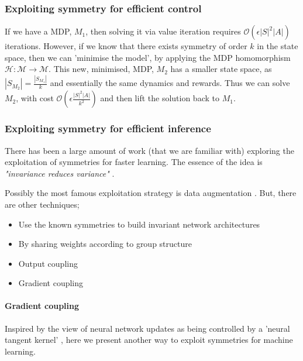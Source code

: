 
\subsubsection{Exploiting symmetry for efficient control}

If we have a MDP, $M_1$, then solving it via value iteration requires $\mathcal O(\epsilon |S|^2|A|)$ iterations.
However, if we know that there exists symmetry of order $k$ in the state space, then we can 'minimise the model',
by applying the MDP homomorphism $\mathcal H: \mathcal M\to \mathcal M$.
This new, minimised, MDP, $M_2$ has a smaller state space, as $|S_{M_2}| = \frac{|S_{M_1}|}{k}$
and essentially the same dynamics and rewards. Thus we can solve $M_2$, with cost $\mathcal O(\epsilon \frac{|S|^2|A|}{k^2})$
and then lift the solution back to $M_1$. \cite{Dean1997, NARAYANAMURTHY}

\subsubsection{Exploiting symmetry for efficient inference}\label{symmetry-inference}

There has been a large amount of work (that we are familiar with) exploring
the exploitation of symmetries for faster learning. The essence of the idea is
\textit{"invariance reduces variance"} \cite{Chen2019}.

Possibly the most famous exploitation strategy is data augmentation \cite{Simard2003}.
But, there are other techniques;

\begin{itemize}
  \tightlist
  \item Use the known symmetries to build invariant network architectures \cite{Abdolhosseini, Anselmi2019}
  \item By sharing weights according to group structure \cite{Yann1995,Ravanbakhsh2017a}
  \item Output coupling \cite{Mahajan2017,Abdolhosseini}
  \item Gradient coupling
\end{itemize}

\paragraph{Gradient coupling}

Inspired by the view of neural network updates as being controlled by a 'neural tangent kernel' \cite{Jacot2018},
here we present another way to exploit symmetries for machine learning.

